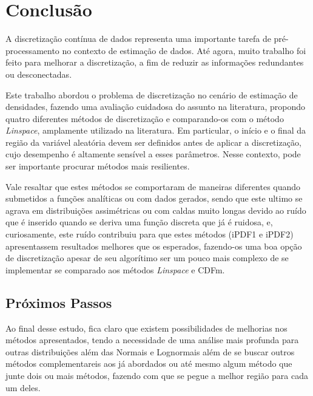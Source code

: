 \chapter{Conclusão} \label{cap:conclusao}
\vspace{-2cm}
A discretização contínua de dados representa uma importante tarefa de pré-processamento no contexto de estimação de dados. Até agora, muito trabalho foi feito para melhorar a discretização, a fim de reduzir as informações redundantes ou desconectadas.

Este trabalho abordou o problema de discretização no cenário de estimação de densidades, fazendo uma avaliação cuidadosa do assunto na literatura, propondo quatro diferentes métodos de discretização e comparando-os com o método \textit{Linspace}, amplamente utilizado na literatura. Em particular, o início e o final da região da variável aleatória devem ser definidos antes de aplicar a discretização, cujo desempenho é altamente sensível a esses parâmetros. Nesse contexto, pode ser importante procurar métodos mais resilientes.

Vale resaltar que estes métodos se comportaram de maneiras diferentes quando submetidos a funções analíticas ou com dados gerados, sendo que este ultimo se agrava em distribuições assimétricas ou com caldas muito longas devido ao ruído que é inserido quando se deriva uma função discreta que já é ruidosa, e, curiosamente, este ruído contribuiu para que estes métodos (\ac{iPDF1} e \ac{iPDF2}) apresentassem resultados melhores que os esperados, fazendo-os uma boa opção de discretização apesar de seu algorítimo ser um pouco mais complexo de se implementar se comparado aos métodos \textit{Linspace} e \ac{CDFm}.

\section{Próximos Passos}
Ao final desse estudo, fica claro que existem possibilidades de melhorias nos métodos apresentados, tendo a necessidade de uma análise mais profunda para outras distribuições além das Normais e Lognormais além de se buscar outros métodos complementareis aos já abordados ou até mesmo algum método que junte dois ou mais métodos, fazendo com que se pegue a melhor região para cada um deles.